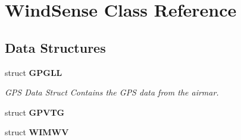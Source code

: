 \hypertarget{classWindSense}{
\section{\-Wind\-Sense \-Class \-Reference}
\label{classWindSense}
}
\subsection*{\-Data \-Structures}
\begin{DoxyCompactItemize}
\item 
struct {\bfseries \-G\-P\-G\-L\-L}
\begin{DoxyCompactList}\small\item\em \-G\-P\-S \-Data \-Struct \-Contains the \-G\-P\-S data from the airmar. \end{DoxyCompactList}\item 
struct {\bfseries \-G\-P\-V\-T\-G}
\item 
struct {\bfseries \-W\-I\-M\-W\-V}
\end{DoxyCompactItemize}

